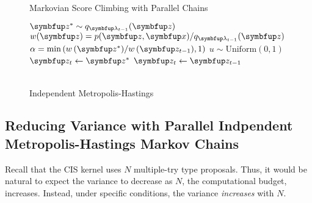 \begin{figure}
  \centering
\begin{minipage}[t]{0.45\textwidth}
  \small
  \begin{algorithm2e}[H]
    \DontPrintSemicolon
    \SetAlgoLined
    \caption{Markovian Score Climbing with Parallel Chains}\label{alg:pimh}
  \end{algorithm2e}
\end{minipage}
\hspace{0.2in}
\begin{minipage}[t]{0.39\textwidth}
  \small
  \begin{algorithm2e}[H]
    \DontPrintSemicolon
    \SetAlgoLined
    \(\vz^* \sim q_{\vlambda_{t-1}}(\vz)\)\;
    \(w(\vz) = p(\vz,\vx)/q_{\vlambda_{t-1}}(\vz) \)\;
    \(\alpha = \min\left( w\,(\vz^*)/w\,(\vz_{t-1}), 1\right)\)\;
    \(u \sim \mathrm{Uniform}(0, 1) \)\;
        {
          \(\vz_t \leftarrow \vz^*\)
        }
        {
          \(\vz_t \leftarrow \vz_{t-1}\)
        }
        \caption{\\ Independent Metropolis-Hastings}\label{alg:pimh}
  \end{algorithm2e}
\end{minipage}
\end{figure}
%
\subsection{Reducing Variance with Parallel Indpendent Metropolis-Hastings Markov Chains}\label{section:cis_bias}
Recall that the CIS kernel uses \(N\) multiple-try type proposals.
Thus, it would be natural to expect the variance to decrease as \(N\), the computational budget, increases.
Instead, under specific conditions, the variance \textit{increases} with \(N\).

